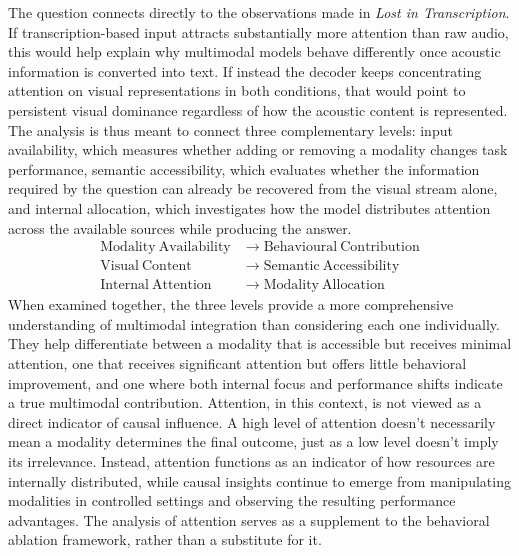The question connects directly to the observations made in \textit{Lost in Transcription}. If transcription-based input attracts substantially more attention than raw audio, this would help explain why multimodal models behave differently once acoustic information is converted into text. If instead the decoder keeps concentrating attention on visual representations in both conditions, that would point to persistent visual dominance regardless of how the acoustic content is represented.
The analysis is thus meant to connect three complementary levels: input availability, which measures whether adding or removing a modality changes task performance, semantic accessibility, which evaluates whether the information required by the question can already be recovered from the visual stream alone, and internal allocation, which investigates how the model distributes attention across the available sources while producing the answer.
\begin{equation}
\begin{aligned}
\mathrm{Modality\ Availability} &\rightarrow \mathrm{Behavioural\ Contribution} \\
\mathrm{Visual\ Content} &\rightarrow \mathrm{Semantic\ Accessibility} \\
\mathrm{Internal\ Attention} &\rightarrow \mathrm{Modality\ Allocation}
\end{aligned}
\end{equation}
When examined together, the three levels provide a more comprehensive understanding of multimodal integration than considering each one individually. They help differentiate between a modality that is accessible but receives minimal attention, one that receives significant attention but offers little behavioral improvement, and one where both internal focus and performance shifts indicate a true multimodal contribution. Attention, in this context, is not viewed as a direct indicator of causal influence. A high level of attention doesn’t necessarily mean a modality determines the final outcome, just as a low level doesn’t imply its irrelevance. Instead, attention functions as an indicator of how resources are internally distributed, while causal insights continue to emerge from manipulating modalities in controlled settings and observing the resulting performance advantages. The analysis of attention serves as a supplement to the behavioral ablation framework, rather than a substitute for it.